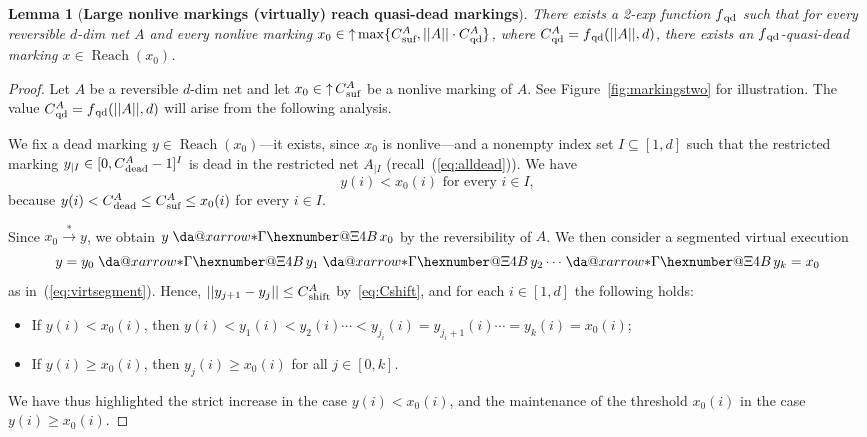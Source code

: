 \documentclass[11pt,a4paper]{amsart}
\makeatletter
\DeclareMathOperator{\Reach}{Reach}
\newcommand{\step}[1]{\mathrel{\xrightarrow{#1}}}
\newcommand{\reach}{\step{*}}
\newcommand{\virtual}[1]{\mathrel{\xdashrightarrow{#1}}\hspace{-0.3em}}
\newcommand{\vreach}{\virtual{*}}
\newcommand{\nnorm}[1]{||#1||}
\newcommand{\upC}[1]{\mathop{\uparrow}#1}
\newcommand{\dead}{{}_\textnormal{dead}}
\newcommand{\suf}{{}_\textnormal{suf}}
\newcommand{\shift}{{}_\textnormal{shift}}
\newcommand{\qd}{{}_\textnormal{qd}}
\newcommand{\restr}[1]{_{|{#1}}}
\newcommand*{\da@rightarrow}{\mathchar"0\hexnumber@\symAMSa 4B }
\newcommand*{\xdashrightarrow}[2][]{%
  \mathrel{%
    \mathpalette{\da@xarrow{#1}{#2}{}\da@rightarrow{\,}{}}{}%
  }%
}
\newcommand*{\da@xarrow}[7]{%
  \sbox0{$\ifx#7\scriptstyle\scriptscriptstyle\else\scriptstyle\fi#5#1#6\m@th$}%
  \sbox2{$\ifx#7\scriptstyle\scriptscriptstyle\else\scriptstyle\fi#5#2#6\m@th$}%
  \sbox4{$#7\dabar@\m@th$}%
  \dimen@=\wd0 %
  \ifdim\wd2 >\dimen@
    \dimen@=\wd2 %
  \fi
  \count@=2 %
  \def\da@bars{\dabar@\dabar@}%
  \@whiledim\count@\wd4<\dimen@\do{%
    \advance\count@\@ne
    \expandafter\def\expandafter\da@bars\expandafter{%
      \da@bars
      \dabar@ 
    }%
  }%
  \mathrel{#3}%
  \mathrel{%
    \mathop{\da@bars}\limits
    \ifx\\#1\\%
    \else
      _{\copy0}%
    \fi
    \ifx\\#2\\%
    \else
      ^{\copy2}%
    \fi
  }%
  \mathrel{#4}%
}
\theoremstyle{plain}
\newtheorem{lem}[thm]{Lemma}
\theoremstyle{definition}
\theoremstyle{defC}
\theoremstyle{thmC}
\makeatother
\begin{document}
\begin{lem}[\textbf{Large nonlive markings (virtually) reach  quasi-dead
	markings}]\label{lem:reachquasi}
	There exists a 2-exp function
$f\qd$ such that 
for every reversible $d$-dim net $A$ and 
	every nonlive marking
$x_0\in\upC{\max\{C\suf^A,\nnorm{A}\cdot C\qd^A\}}$, where
$C\qd^A=f\qd(\nnorm{A},d)$,
	there exists an $f\qd$-quasi-dead marking $x\in\Reach(x_0)$.
\end{lem}
\begin{proof}
Let $A$ be a reversible $d$-dim net and 
let	$x_0\in\upC{C\suf^A}$ be
	a nonlive marking of $A$.
	See Figure~\ref{fig:markingstwo} for illustration.
	The value $C\qd^A=f\qd(\nnorm{A},d)$ will arise from the
	following analysis.

	We fix a dead marking
	$y\in\Reach(x_0)$---it exists, since $x_0$ is nonlive---and a nonempty index set $I\subseteq [1,d]$ such that the
	restricted marking 
	$y\restr{I}\in[0,C\dead^A-1]^I$ is dead in the restricted net
	$A\restr{I}$ (recall~(\ref{eq:alldead})).
We have 
	\begin{equation}\label{eq:Iless}
		y(i)< x_0(i)\text{ for every }i\in I,
	\end{equation}		
because $y(i)< C\dead^A\leq C\suf^A\leq x_0(i)$ for every $i\in I$.

	Since  $x_0\reach y$, we obtain $y\vreach x_0$ by
the reversibility of $A$. We then consider a segmented
 virtual execution  
	\begin{equation}\label{eq:downup}
y=y_0\vreach y_1\vreach y_2\cdots\vreach y_k=x_0
	\end{equation}
	as in~(\ref{eq:virtsegment}).
	Hence, $\nnorm{y_{j+1}-y_j}\leq C\shift^A$ by~\eqref{eq:Cshift}, and 
for each $i\in[1,d]$ the following holds:
\begin{itemize}
\item If $y(i)<x_0(i)$, then
	$y(i)<y_1(i)<y_2(i)\cdots <y_{j_i}(i)=y_{j_i+1}(i)\cdots
	=y_k(i)=x_0(i)$;
\item	
If $y(i)\geq x_0(i)$, then $y_j(i)\geq x_0(i)$ for all
	$j\in[0,k]$.
	\end{itemize}
We have thus highlighted the strict increase in the case
	$y(i)<x_0(i)$, and the maintenance of the threshold $x_0(i)$ in
	the case $y(i)\geq x_0(i)$.


\end{proof}
\end{document}
